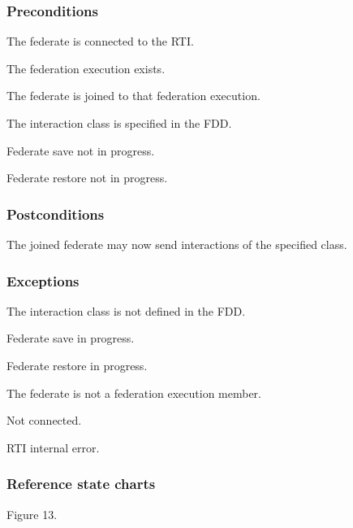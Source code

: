 \begin{compactstdpage}
    \subsubsection{Preconditions}
    \begin{stdalphalist}
        \item The federate is connected to the RTI.
        \item The federation execution exists.
        \item The federate is joined to that federation execution.
        \item The interaction class is specified in the FDD.
        \item Federate save not in progress.
        \item Federate restore not in progress.
    \end{stdalphalist}

    \subsubsection{Postconditions}
    \begin{stdalphalist}
        \item The joined federate may now send interactions of the specified class.
    \end{stdalphalist}

    \subsubsection{Exceptions}
    \begin{stdalphalist}
        \item The interaction class is not defined in the FDD.
        \item Federate save in progress.
        \item Federate restore in progress.
        \item The federate is not a federation execution member.
        \item Not connected.
        \item RTI internal error.
    \end{stdalphalist}

    \subsubsection{Reference state charts}
    \begin{stdalphalist}
        \item Figure 13.
    \end{stdalphalist}
\end{compactstdpage}

